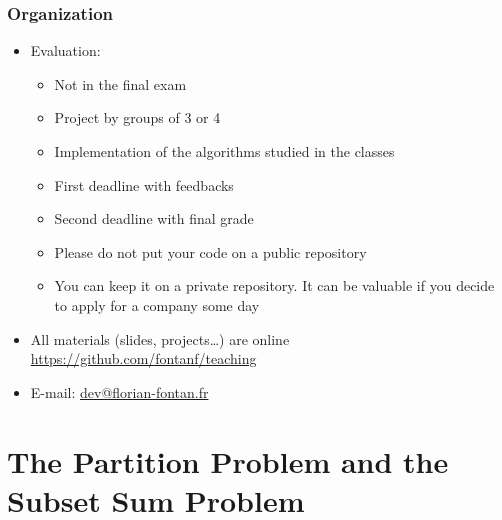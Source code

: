 \documentclass{beamer}
\begin{document}
\begin{frame}
  \frametitle{Organization}
  \begin{itemize}
    \item Evaluation:
      \begin{itemize}
        \item Not in the final exam
        \item Project by groups of 3 or 4
        \item Implementation of the algorithms studied in the classes
        \item First deadline with feedbacks
        \item Second deadline with final grade
        \item Please do not put your code on a public repository
        \item You can keep it on a private repository. It can be valuable if you decide to apply for a company some day
      \end{itemize}
    \item All materials (slides, projects\dots) are online \url{https://github.com/fontanf/teaching}
    \item E-mail: \href{mailto:dev@florian-fontan.fr}{dev@florian-fontan.fr}
  \end{itemize}
\end{frame}

\section{The Partition Problem and the Subset Sum Problem}
\end{document}
